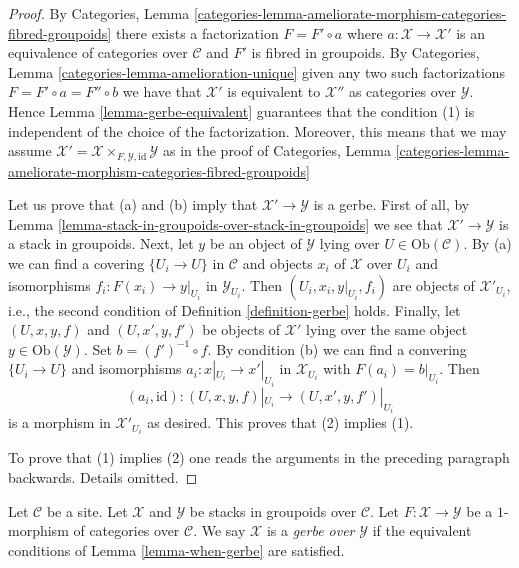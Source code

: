 \begin{proof}
By
Categories, Lemma
\ref{categories-lemma-ameliorate-morphism-categories-fibred-groupoids}
there exists a factorization $F = F' \circ a$ where
$a : \mathcal{X} \to \mathcal{X}'$ is an equivalence of categories over
$\mathcal{C}$ and $F'$ is fibred in groupoids. By
Categories, Lemma \ref{categories-lemma-amelioration-unique}
given any two such factorizations $F = F' \circ a = F'' \circ b$
we have that $\mathcal{X}'$ is equivalent to $\mathcal{X}''$ as
categories over $\mathcal{Y}$. Hence
Lemma \ref{lemma-gerbe-equivalent}
guarantees that the condition (1) is independent of the choice of the
factorization. Moreover, this means that we may assume
$\mathcal{X}' = \mathcal{X} \times_{F, \mathcal{Y}, \text{id}} \mathcal{Y}$
as in the proof of
Categories, Lemma
\ref{categories-lemma-ameliorate-morphism-categories-fibred-groupoids}

\medskip\noindent
Let us prove that (a) and (b) imply that $\mathcal{X}' \to \mathcal{Y}$
is a gerbe. First of all, by
Lemma \ref{lemma-stack-in-groupoids-over-stack-in-groupoids}
we see that $\mathcal{X}' \to \mathcal{Y}$ is a stack in groupoids.
Next, let $y$ be an object of $\mathcal{Y}$ lying over
$U \in \text{Ob}(\mathcal{C})$. By (a) we can find a covering
$\{U_i \to U\}$ in $\mathcal{C}$ and objects $x_i$ of $\mathcal{X}$
over $U_i$ and isomorphisms $f_i : F(x_i) \to y|_{U_i}$ in
$\mathcal{Y}_{U_i}$. Then $(U_i, x_i, y|_{U_i}, f_i)$ are objects
of $\mathcal{X}'_{U_i}$, i.e., the second condition of
Definition \ref{definition-gerbe}
holds. Finally, let $(U, x, y, f)$ and $(U, x', y, f')$ be objects
of $\mathcal{X}'$ lying over the same object $y \in \text{Ob}(\mathcal{Y})$.
Set $b = (f')^{-1} \circ f$. By condition (b) we can find a convering
$\{U_i \to U\}$ and isomorphisms $a_i : x|_{U_i} \to x'|_{U_i}$
in $\mathcal{X}_{U_i}$ with $F(a_i) = b|_{U_i}$. Then
$$
(a_i, \text{id}) : (U, x, y, f)|_{U_i} \to (U, x', y, f')|_{U_i}
$$
is a morphism in $\mathcal{X}'_{U_i}$ as desired. This proves that
(2) implies (1).

\medskip\noindent
To prove that (1) implies (2) one reads the arguments
in the preceding paragraph backwards. Details omitted.
\end{proof}

\begin{definition}
\label{definition-gerbe-over-stack-in-groupoids}
Let $\mathcal{C}$ be a site. Let $\mathcal{X}$
and $\mathcal{Y}$ be stacks in groupoids over $\mathcal{C}$.
Let $F : \mathcal{X} \to \mathcal{Y}$ be a $1$-morphism of categories
over $\mathcal{C}$. We say $\mathcal{X}$ is a {\it gerbe over} $\mathcal{Y}$
if the equivalent conditions of
Lemma \ref{lemma-when-gerbe}
are satisfied.
\end{definition}

